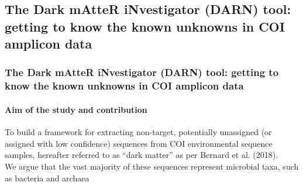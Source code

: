 \documentclass{beamer}
\begin{document}

   \begin{darkframes}
      \subsection{The Dark mAtteR iNvestigator (DARN) tool: getting to know
      the known unknowns in COI amplicon data}
   \end{darkframes}
   
   \begin{darkframes}
      \begin{frame}
         \frametitle{The Dark mAtteR iNvestigator (DARN) tool: getting to know
         the known unknowns in COI amplicon data}
         \framesubtitle{Aim of the study and contribution}


         To build a framework for extracting non-target, potentially unassigned 
         (or assigned with low confidence) sequences from COI environmental
         sequence samples, hereafter referred to as “dark matter” as per Bernard et al. (2018). \\
         \bigskip
         We argue that the vast majority of these sequences represent
         microbial taxa, such as bacteria and archaea

      \end{frame}
   \end{darkframes}
\end{document}
